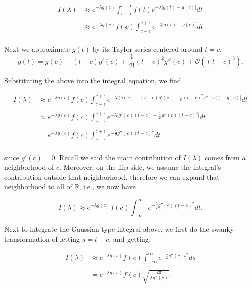 \begin{align*}
I(\lambda) &\approx e^{-\lambda g(c)} \int_{c-\epsilon}^{c+\epsilon} f(t) e^{ -\lambda\big[ g(t) - g(c) \big] } dt \\ \\
	& \approx  e^{-\lambda g(c)} f(c) \int_{c-\epsilon}^{c+\epsilon} e^{ -\lambda\big[ g(t) - g(c) \big] } dt  \\ 
\end{align*}

Next we approximate $g(t)$ by its Taylor series centered around $t=c$, 
$$g(t) = g(c) +(t-c)g'(c) + \frac{1}{2!} (t-c)^2 g''(c) + \mathcal{O}( (t-c)^3 ).$$

Substituting the above into the integral equation, we find

\begin{align*}
I(\lambda) &\approx e^{-\lambda g(c)} f(c) \int_{c-\epsilon}^{c+\epsilon} e^{ -\lambda\big[ \big( g(c) +(t-c)g'(c) + \frac{1}{2!} (t-c)^2 g''(c) \big) - g(c) \big] } dt \\ \\
	& \approx  e^{-\lambda g(c)} f(c) \int_{c-\epsilon}^{c+\epsilon} e^{ -\lambda\big[  g'(c)(t-c) + \frac{1}{2!}  g''(c)(t-c)^2 \big] } dt  \\  \\
	&= e^{-\lambda g(c)} f(c) \int_{c-\epsilon}^{c+\epsilon} e^{ - \frac{\lambda}{2}  g''(c)(t-c)^2 } dt  \\  
\end{align*}

since $g'(c)=0$. Recall we said the main contribution of $I(\lambda)$ comes from a neighborhood of $c$. Moreover, on the flip side, we assume the integral's contribution outside that neighborhood, therefore we can expand that neighborhood to all of $\mathbb{R}$, i.e., we now have

\begin{equation*}
I(\lambda)  \approx e^{-\lambda g(c)} f(c) \int_{-\infty}^{\infty} e^{ - \frac{\lambda}{2}  g''(c)(t-c)^2 } dt.
\end{equation*}

Next to integrate the Gaussian-type integral above, we first do the swanky transformation of letting $s = t-c$, and getting

\begin{align*}
I(\lambda) &\approx e^{-\lambda g(c)} f(c) \int_{-\infty}^{\infty} e^{ - \frac{\lambda}{2}  g''(c)s^2 } ds  \\ \\
	&= e^{-\lambda g(c) } f(c) \sqrt{ \frac{2\pi}{\lambda g''(c) } }.
\end{align*}

